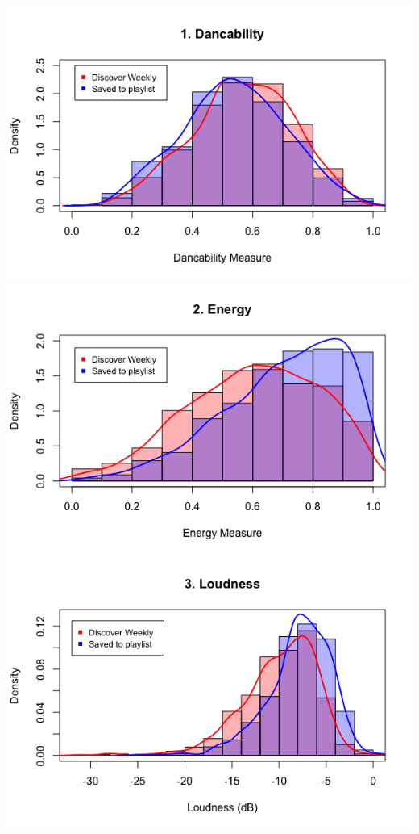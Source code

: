 \documentclass{article}
\begin{document}
		\includegraphics[width=\textwidth]{1_dancability} 
		\includegraphics[width=\textwidth]{2_energy} \\
		\includegraphics[width=\textwidth]{3_loudness}\\
\end{document}
